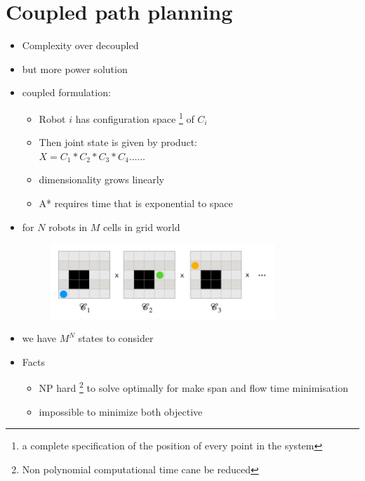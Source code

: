 \documentclass[a4paper]{article}
\begin{document}
    \section{Coupled path planning}
    \begin{itemize}
        \item Complexity over decoupled
        \item but more power solution
        \item coupled formulation:
            \begin{itemize}
                \item Robot $i$ has configuration space \footnote{a complete specification of the position of every point in the system} of  $C_i$
                \item Then joint state is given by product:\\
                        $X=C_1*C_2*C_3*C_4 \ldots\ldots$
                \item dimensionality grows linearly
                \item A* requires time that is exponential to space
            \end{itemize}
        \item for $N$ robots in  $M$ cells in grid world 
        \begin{figure}[H]
                \centering
                \includegraphics[width=0.8\textwidth]{mrcoupledspace.png}
                \caption{}
                \label{fig:}
            \end{figure} 
        \item we have $M^N$ states to consider
            \item Facts
        \begin{itemize}
            \item  NP hard \footnote{Non polynomial computational time cane be reduced } to solve optimally for make span and flow time minimisation
                \item impossible to minimize both objective 
        \end{itemize}
    \end{itemize}
\end{document}
